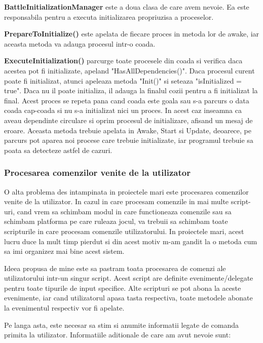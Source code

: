 \documentclass[12pt, a4paper]{article}
\begin{document}
	\textbf{BattleInitializationManager} este a doua clasa de care avem nevoie. Ea este responsabila pentru a executa initializarea propriuzisa a proceselor. 
	
	\textbf{PrepareToInitialize()} este apelata de fiecare proces in metoda lor de awake, iar aceasta metoda va adauga procesul intr-o coada.
	
	\textbf{ExecuteInitialization()} parcurge toate procesele din coada si verifica daca acestea pot fi initializate, apeland "HasAllDependencies()". Daca procesul curent poate fi initializat, atunci apeleaza metoda "Init()" si seteaza "isInitialized = true". Daca nu il poate initializa, il adauga la finalul cozii pentru a fi initializat la final. Acest proces se repeta pana cand coada este goala sau s-a parcurs o data coada cap-coada si nu s-a initializat nici un proces. In acest caz inseamna ca aveau dependinte circulare si oprim procesul de initializare, afisand un mesaj de eroare. Aceasta metoda trebuie apelata in Awake, Start si Update, deoarece, pe parcurs pot aparea noi procese care trebuie initializate, iar programul trebuie sa poata sa detecteze astfel de cazuri.
	
	\subsubsection{Procesarea comenzilor venite de la utilizator}
	
	O alta problema des intampinata in proiectele mari este procesarea comenzilor venite de la utilizator. In cazul in care procesam comenzile in mai multe script-uri, cand vrem sa schimbam modul in care functioneaza comenzile sau sa schimbam platforma pe care ruleaza jocul, va trebuii sa schimbam toate scripturile in care procesam comenzile utilizatorului. In proiectele mari, acest lucru duce la mult timp pierdut si din acest motiv m-am gandit la o metoda cum sa imi organizez mai bine acest sistem.
	
	Ideea propusa de mine este sa pastram toata procesarea de comenzi ale utilizatorului intr-un singur script. Acest script are definite evenimente/delegate pentru toate tipurile de input specifice. Alte scripturi se pot abona la aceste evenimente, iar cand utilizatorul apasa tasta respectiva, toate metodele abonate la evenimentul respectiv vor fi apelate.
	
	Pe langa asta, este necesar sa stim si anumite informatii legate de comanda primita la utilizator. Informatiile aditionale de care am avut nevoie sunt:
	
\end{document}
